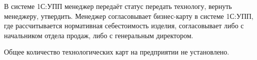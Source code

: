 В системе 1С:УПП менеджер передаёт статус передать технологу, вернуть менеджеру, утвердить.
Менеджер согласовывает бизнес-карту в системе 1С:УПП, где рассчитывается нормативная себестоимость изделия, согласовывает либо с начальником отдела продаж, либо с генеральным директором.


Общее количество технологических карт на предприятии не установлено. 








